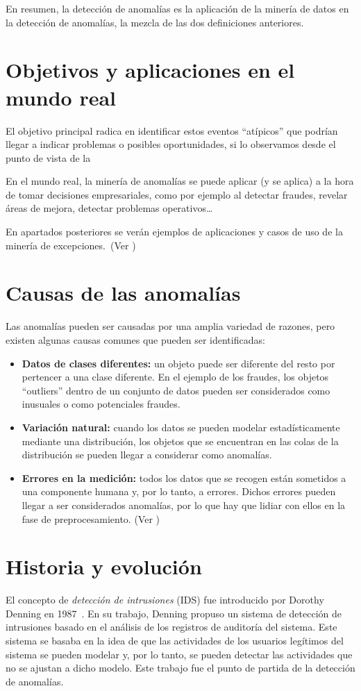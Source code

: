 En resumen, la detección de anomalías es la aplicación de la minería de datos en la detección
de anomalías, la mezcla de las dos definiciones anteriores.


\section{Objetivos y aplicaciones en el mundo real}
El objetivo principal radica en identificar estos eventos ``atípicos'' que podrían llegar
a indicar problemas o posibles oportunidades, si lo observamos desde el punto de vista de
la \subject.

En el mundo real, la minería de anomalías se puede aplicar (y se aplica) a la hora de
tomar decisiones empresariales, como por ejemplo al detectar fraudes, revelar áreas de
mejora, detectar problemas operativos\ldots

En apartados posteriores se verán ejemplos de aplicaciones y casos de uso de la minería de
excepciones.~(Ver )

\section{Causas de las anomalías}
Las anomalías pueden ser causadas por una amplia variedad de razones, pero existen algunas
causas comunes que pueden ser identificadas:

\begin{itemize}
	\item \textbf{Datos de clases diferentes:} un objeto puede ser diferente del resto por
		pertencer a una clase diferente. En el ejemplo de los fraudes, los objetos ``outliers''
		dentro de un conjunto de datos pueden ser considerados como inusuales o como potenciales
		fraudes.
	\item \textbf{Variación natural:} cuando los datos se pueden modelar estadísticamente
		mediante una distribución, los objetos que se encuentran en las colas de la distribución
		se pueden llegar a considerar como anomalías.
	\item \textbf{Errores en la medición:} todos los datos que se recogen están sometidos a una
		componente humana y, por lo tanto, a errores. Dichos errores pueden llegar a ser
		considerados anomalías, por lo que hay que lidiar con ellos en la fase de preprocesamiento.
		(Ver )
\end{itemize}

\section{Historia y evolución}\label{sec:hist}
El concepto de \textit{detección de intrusiones} (IDS) fue introducido por Dorothy Denning en
1987~\cite{denning1987intrusion}. En su trabajo, Denning propuso un sistema de detección de intrusiones
basado en el análisis de los registros de auditoría del sistema. Este sistema se basaba en la idea
de que las actividades de los usuarios legítimos del sistema se pueden modelar y, por lo tanto,
se pueden detectar las actividades que no se ajustan a dicho modelo. Este trabajo fue el punto de
partida de la detección de anomalías.

